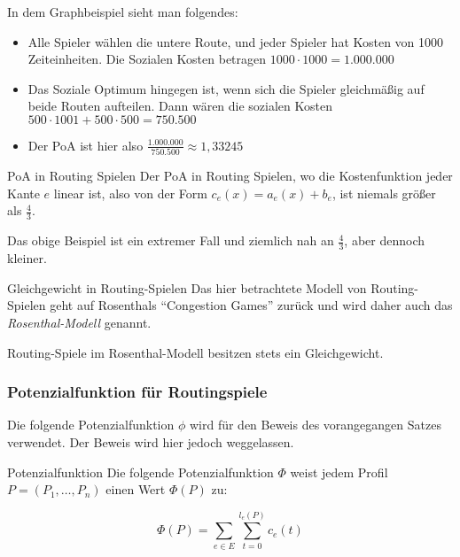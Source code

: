\documentclass{panikzettel}
\newcommand{\boxspace}{	\vspace{-\baselineskip}	}
\begin{document}
In dem Graphbeispiel sieht man folgendes:

\begin{itemize}
	\item Alle Spieler wählen die untere Route, und jeder Spieler hat Kosten von 1000 Zeiteinheiten. Die Sozialen Kosten betragen $1000 \cdot 1000 = 1.000.000$
	\item Das Soziale Optimum hingegen ist, wenn sich die Spieler gleichmäßig auf beide Routen aufteilen. Dann wären die sozialen Kosten $500 \cdot 1001 + 500 \cdot 500 = 750.500$
	\item Der PoA ist hier also $\frac{1.000.000}{750.500} \approx 1, 33245$
\end{itemize}

\begin{halfboxl}
	\boxspace
\begin{theo}{PoA in Routing Spielen}
	Der PoA in Routing Spielen, wo die Kostenfunktion jeder Kante $e$ linear ist, also von der Form $c_e(x) = a_e(x) + b_e$, ist niemals größer als $\frac{4}{3}$.
	
	Das obige Beispiel ist ein extremer Fall und ziemlich nah an $\frac{4}{3}$, aber dennoch kleiner.
\end{theo}
\end{halfboxl}%
\begin{halfboxr}
	\boxspace
	\begin{theo}{Gleichgewicht in Routing-Spielen}
		Das hier betrachtete Modell von Routing-Spielen geht auf Rosenthals ``Congestion Games'' zurück und wird daher auch das \emph{Rosenthal-Modell} genannt.
		
		Routing-Spiele im Rosenthal-Modell besitzen stets ein Gleichgewicht.
	\end{theo}
\end{halfboxr}

\subsubsection{Potenzialfunktion für Routingspiele}

Die folgende Potenzialfunktion $\phi$ wird für den Beweis des vorangegangen Satzes verwendet. Der Beweis wird hier jedoch weggelassen.

\begin{defi}{Potenzialfunktion}
	Die folgende Potenzialfunktion $\Phi $ weist jedem Profil $P = (P_1, \dots , P_n)$ einen Wert $\Phi (P)$ zu:
	
	\[\Phi (P) = \sum_{e \in E} \sum_{t = 0 }^{l_e(P)} c_e(t) \]
\end{defi}
\end{document}
